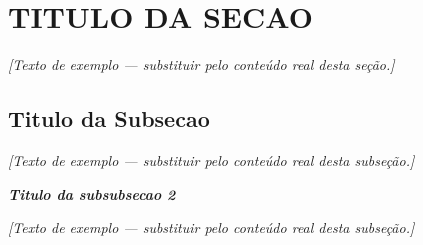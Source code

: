 \section{TITULO DA SECAO}\label{sec:metodologia}
\textit{[Texto de exemplo --- substituir pelo conteúdo real desta seção.]}
\subsection{Titulo da Subsecao}\label{subsec:metodologia}
\textit{[Texto de exemplo --- substituir pelo conteúdo real desta subseção.]}

\noindent\textbf{\textit{Titulo da subsubsecao 2}}

\textit{[Texto de exemplo --- substituir pelo conteúdo real desta subseção.]}
